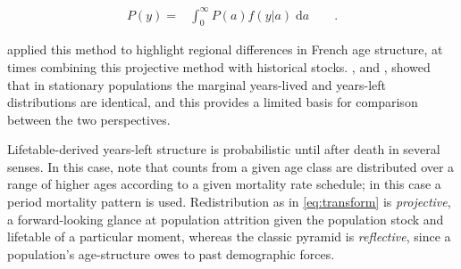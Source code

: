 \documentclass[12pt,oneside,a4paper,leqno]{article}
\newcommand{\dd}{\; \mathrm{d}}
\newcommand{\ep}{\quad\quad\text{.}}
\begin{document}
\begin{align}
\label{eq:transform}
P(y) =& \int_0^\infty P(a) f(y | a) \dd a \ep
\end{align}



\citet{brouard1986structure} applied this method to highlight regional
differences in French age structure, at times combining this projective method
with historical stocks. \citet{brouard1989mouvements}, and \citet{vaupel2009life}, showed that in stationary populations the
marginal years-lived and years-left distributions are identical,
and this provides a limited basis for comparison between the two perspectives. 

Lifetable-derived years-left structure is
probabilistic until after death in several senses. In this case, note that
counts from a given age class are distributed over a range of higher ages
according to a given mortality rate schedule; in this
case a period mortality pattern is used.
Redistribution as in \eqref{eq:transform} is \textit{projective}, a
forward-looking glance at population attrition given the population stock and lifetable of a
particular moment, whereas the classic pyramid is \textit{reflective}, since a
population's age-structure owes to past demographic forces.
\end{document}
